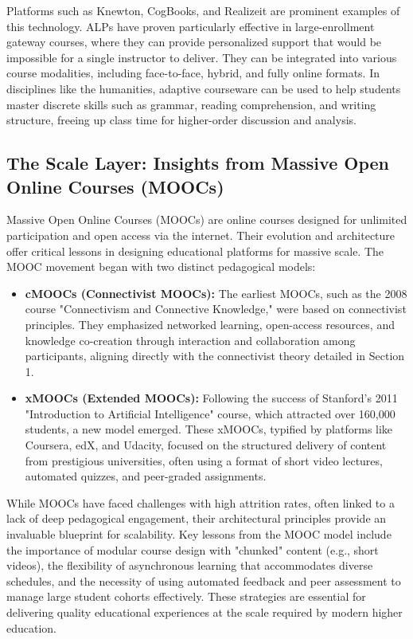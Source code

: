 \documentclass{article}
\begin{document}
Platforms such as Knewton, CogBooks, and Realizeit are prominent examples of this technology.\cite{38, 39} ALPs have proven particularly effective in large-enrollment gateway courses, where they can provide personalized support that would be impossible for a single instructor to deliver.\cite{34} They can be integrated into various course modalities, including face-to-face, hybrid, and fully online formats.\cite{34, 39} In disciplines like the humanities, adaptive courseware can be used to help students master discrete skills such as grammar, reading comprehension, and writing structure, freeing up class time for higher-order discussion and analysis.\cite{40}

\subsection{The Scale Layer: Insights from Massive Open Online Courses (MOOCs)}

Massive Open Online Courses (MOOCs) are online courses designed for unlimited participation and open access via the internet.\cite{41, 42, 43} Their evolution and architecture offer critical lessons in designing educational platforms for massive scale. The MOOC movement began with two distinct pedagogical models:

\begin{itemize}
    \item \textbf{cMOOCs (Connectivist MOOCs):} The earliest MOOCs, such as the 2008 course "Connectivism and Connective Knowledge," were based on connectivist principles.\cite{42} They emphasized networked learning, open-access resources, and knowledge co-creation through interaction and collaboration among participants, aligning directly with the connectivist theory detailed in Section 1.\cite{41}
    \item \textbf{xMOOCs (Extended MOOCs):} Following the success of Stanford's 2011 "Introduction to Artificial Intelligence" course, which attracted over 160,000 students, a new model emerged.\cite{42} These xMOOCs, typified by platforms like Coursera, edX, and Udacity, focused on the structured delivery of content from prestigious universities, often using a format of short video lectures, automated quizzes, and peer-graded assignments.\cite{41, 42}
\end{itemize}

While MOOCs have faced challenges with high attrition rates, often linked to a lack of deep pedagogical engagement, their architectural principles provide an invaluable blueprint for scalability.\cite{41} Key lessons from the MOOC model include the importance of modular course design with "chunked" content (e.g., short videos), the flexibility of asynchronous learning that accommodates diverse schedules, and the necessity of using automated feedback and peer assessment to manage large student cohorts effectively.\cite{41, 44} These strategies are essential for delivering quality educational experiences at the scale required by modern higher education.\cite{43, 45}
\end{document}
